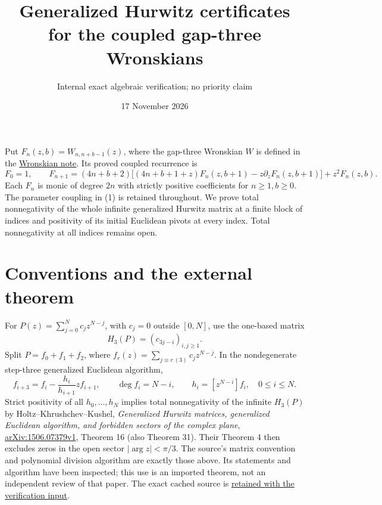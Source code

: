 \documentclass[11pt]{article}
\title{Generalized Hurwitz certificates for the coupled gap-three Wronskians}
\author{Internal exact algebraic verification; no priority claim}
\date{17 November 2026}
\begin{document}
\maketitle
Put $F_n(z,b)=W_{n,n+b-1}(z)$, where the gap-three Wronskian $W$
is defined in the \href{GAP_THREE_WRONSKIAN_RECURRENCE.tex}{Wronskian note}.
Its proved coupled recurrence is
\[
 F_0=1,\qquad
 F_{n+1}=(4n+b+2)\bigl[(4n+b+1+z)F_n(z,b+1)
                -z\partial_zF_n(z,b+1)\bigr]+z^2F_n(z,b).       \tag{1}
\]
Each $F_n$ is monic of degree $2n$ with strictly positive coefficients
for $n\ge1,b\ge0$. The parameter coupling in (1) is retained throughout.
We prove total nonnegativity of the whole infinite generalized Hurwitz
matrix at a finite block of indices and positivity of its initial
Euclidean pivots at every index. Total nonnegativity at all indices
remains open.

\section{Conventions and the external theorem}
For $P(z)=\sum_{j=0}^N c_jz^{N-j}$, with $c_j=0$ outside $[0,N]$,
use the one-based matrix
\[
 H_3(P)=(c_{3j-i})_{i,j\ge1}.
\]
Split $P=f_0+f_1+f_2$, where
$f_r(z)=\sum_{j\equiv r\ (3)}c_jz^{N-j}$.
In the nondegenerate step-three generalized Euclidean algorithm,
\[
 f_{i+3}=f_i-\frac{h_i}{h_{i+1}}zf_{i+1},\qquad
 \deg f_i=N-i,\qquad h_i=[z^{N-i}]f_i,\quad 0\le i\le N.      \tag{2}
\]
Strict positivity of all $h_0,\ldots,h_N$ implies total nonnegativity
of the infinite $H_3(P)$ by Holtz--Khrushchev--Kushel,
\emph{Generalized Hurwitz matrices, generalized Euclidean algorithm,
and forbidden sectors of the complex plane},
\href{https://arxiv.org/pdf/1506.07379v1}{arXiv:1506.07379v1},
Theorem 16 (also Theorem 31).
Their Theorem 4 then excludes zeros in the open sector
$|\arg z|<\pi/3$.
The source's matrix convention and polynomial division algorithm are
exactly those above. Its statements and algorithm have been inspected;
this use is an imported theorem, not an independent review of that paper.
The exact cached source is
\href{sources/holtz-khrushchev-kushel-2015-v1.pdf}{retained with the verification input}.
\end{document}
